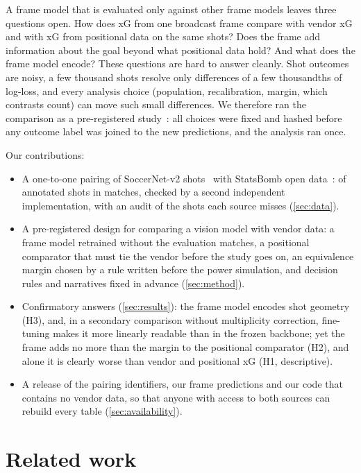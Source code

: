 \documentclass[10pt,twocolumn,letterpaper]{article}
\newcommand{\Hone}{H1\xspace}\newcommand{\Htwo}{H2\xspace}\newcommand{\Hthree}{H3\xspace}\newcommand{\Hfour}{H4\xspace}
\begin{document}
A frame model that is evaluated only against other frame models leaves three questions open.
How does xG from one broadcast frame compare with vendor xG and with xG from positional data on the same shots? Does
the frame add information about the goal beyond what positional data hold? And what does the frame model encode?
These questions are hard to answer cleanly. Shot outcomes are noisy, a few thousand shots resolve only differences of a
few thousandths of log-loss, and every analysis choice (population, recalibration, margin, which contrasts count) can
move such small differences. We therefore ran the comparison as a pre-registered study~\cite{nosek2018preregistration}:
all choices were fixed and hashed before any outcome label was joined to the new predictions, and the analysis ran
once.

Our contributions:
\begin{itemize}[leftmargin=*,itemsep=1pt,topsep=2pt]
  \item A one-to-one pairing of SoccerNet-v2 shots~\cite{deliege2021soccernetv2} with StatsBomb open
  data~\cite{statsbomb_opendata}:  of  annotated shots in  matches,
  checked by a second independent implementation, with an audit of the shots each source misses (\cref{sec:data}).
  \item A pre-registered design for comparing a vision model with vendor data: a frame model retrained without the
  evaluation matches, a positional comparator that must tie the vendor before the study goes on, an equivalence margin
  chosen by a rule written before the power simulation, and decision rules and narratives fixed in
  advance (\cref{sec:method}).
  \item Confirmatory answers (\cref{sec:results}): the frame model encodes shot geometry (\Hthree), and, in a secondary
  comparison without multiplicity correction, fine-tuning makes it more linearly readable than in the frozen backbone;
  yet the frame adds no more than the margin to the positional comparator (\Htwo), and alone it is clearly worse than vendor and positional xG (\Hone, descriptive).
  \item A release of the pairing identifiers, our frame predictions and our code that contains no vendor data, so
  that anyone with access to both sources can rebuild every table (\cref{sec:availability}).
\end{itemize}

\section{Related work}
\label{sec:related}
\end{document}
